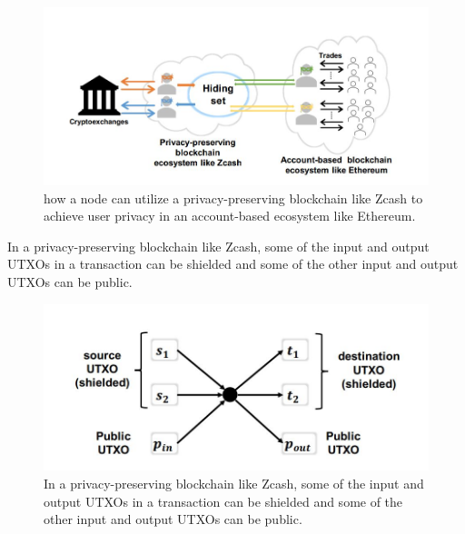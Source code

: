 \documentclass{report}
\begin{document}
\begin{center}
	\begin{figure}
		\centering
		\includegraphics[width=0.8\linewidth]{Fig/F5}
		\caption{
			how a node can utilize a privacy-preserving blockchain like Zcash to achieve user privacy in an account-based ecosystem like Ethereum.
		}
		\label{fig:f5}
	\end{figure}
\end{center}
In a privacy-preserving blockchain like Zcash, some of the input and output UTXOs in a  transaction can be shielded and some of the other input and output UTXOs can be public.
\begin{center}
	\begin{figure}
		\centering
		\includegraphics[width=0.8\linewidth]{Fig/F6}
		\caption{
			In a privacy-preserving blockchain like Zcash, some of the input and output UTXOs in a  transaction can be shielded and some of the other input and output UTXOs can be public.
		}
		\label{fig:f6}
	\end{figure}
\end{center}
\end{document}
